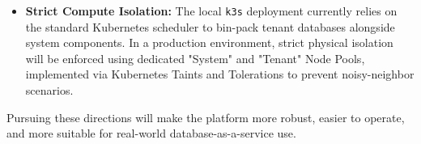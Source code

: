 \begin{itemize}
   \item \textbf{Strict Compute Isolation:} The local \texttt{k3s} deployment currently relies on the standard Kubernetes scheduler to bin-pack tenant databases alongside system components. In a production environment, strict physical isolation will be enforced using dedicated "System" and "Tenant" Node Pools, implemented via Kubernetes Taints and Tolerations to prevent noisy-neighbor scenarios.
\end{itemize}

Pursuing these directions will make the platform more robust, easier to operate, and more suitable for real-world database-as-a-service use.
